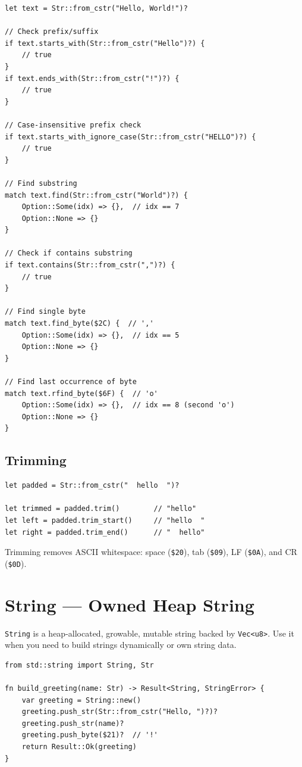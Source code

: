 \begin{lstlisting}
let text = Str::from_cstr("Hello, World!")?

// Check prefix/suffix
if text.starts_with(Str::from_cstr("Hello")?) {
    // true
}
if text.ends_with(Str::from_cstr("!")?) {
    // true
}

// Case-insensitive prefix check
if text.starts_with_ignore_case(Str::from_cstr("HELLO")?) {
    // true
}

// Find substring
match text.find(Str::from_cstr("World")?) {
    Option::Some(idx) => {},  // idx == 7
    Option::None => {}
}

// Check if contains substring
if text.contains(Str::from_cstr(",")?) {
    // true
}

// Find single byte
match text.find_byte($2C) {  // ','
    Option::Some(idx) => {},  // idx == 5
    Option::None => {}
}

// Find last occurrence of byte
match text.rfind_byte($6F) {  // 'o'
    Option::Some(idx) => {},  // idx == 8 (second 'o')
    Option::None => {}
}
\end{lstlisting}

\subsection{Trimming}

\begin{lstlisting}
let padded = Str::from_cstr("  hello  ")?

let trimmed = padded.trim()        // "hello"
let left = padded.trim_start()     // "hello  "
let right = padded.trim_end()      // "  hello"
\end{lstlisting}

Trimming removes ASCII whitespace: space (\texttt{\$20}), tab (\texttt{\$09}), LF (\texttt{\$0A}), and CR (\texttt{\$0D}).

\section{String --- Owned Heap String}
\label{sec:string-type}

\texttt{String} is a heap-allocated, growable, mutable string backed by \texttt{Vec<u8>}. Use it when you need to build strings dynamically or own string data.

\begin{lstlisting}
from std::string import String, Str

fn build_greeting(name: Str) -> Result<String, StringError> {
    var greeting = String::new()
    greeting.push_str(Str::from_cstr("Hello, ")?)?
    greeting.push_str(name)?
    greeting.push_byte($21)?  // '!'
    return Result::Ok(greeting)
}
\end{lstlisting}

